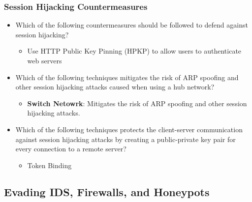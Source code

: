 \subsubsection{Session Hijacking Countermeasures}
\begin{itemize}
    \item Which of the following countermeasures should be followed to defend against session hijacking?
    \begin{itemize}
        \item Use HTTP Public Key Pinning (HPKP) to allow users to authenticate web servers
    \end{itemize}
    \item Which of the following techniques mitigates the risk of ARP spoofing and other session hijacking attacks caused when using a hub network?
    \begin{itemize}
        \item \textbf{Switch Netowrk}: Mitigates the risk of ARP spoofing and other session hijacking attacks.
    \end{itemize}
    \item Which of the following techniques protects the client-server communication against session hijacking attacks by creating a public-private key pair for every connection to a remote server?
    \begin{itemize}
        \item Token Binding
    \end{itemize}
\end{itemize}


\subsection{Evading IDS, Firewalls, and Honeypots}

